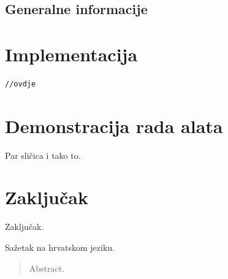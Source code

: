 \documentclass[times, utf8, diplomski]{fer}
\begin{document}
\section{Generalne informacije}


\chapter{Implementacija}

\begin{lstlisting}
//ovdje
\end{lstlisting}

\chapter{Demonstracija rada alata}
Par sličica i tako to.

\chapter{Zaključak}
Zaključak.




\begin{sazetak}
Sažetak na hrvatskom jeziku.

\end{sazetak}

\begin{abstract}
Abstract.

\end{abstract}
\end{document}
